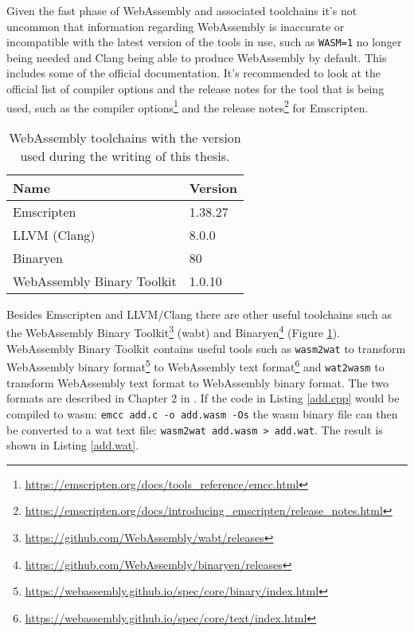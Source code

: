 Given the fast phase of WebAssembly and associated toolchains it's not uncommon that information regarding WebAssembly is inaccurate or incompatible with the latest version of the tools in use, such as \texttt{WASM=1} no longer being needed and Clang being able to produce WebAssembly by default. This includes some of the official documentation. It's recommended to look at the official list of compiler options and the release notes for the tool that is being used, such as the compiler options\footnote{\url{https://emscripten.org/docs/tools_reference/emcc.html}} and the release notes\footnote{\url{https://emscripten.org/docs/introducing_emscripten/release_notes.html}} for Emscripten.

\begin{table}[]
\caption{\label{toolchains}WebAssembly toolchains with the version used during the writing of this thesis.}
\centering
\begin{tabular}{ll}
\hline
\textbf{Name} & \textbf{Version} \\ \hline
Emscripten & 1.38.27 \\
LLVM (Clang) & 8.0.0 \\
Binaryen & 80 \\
WebAssembly Binary Toolkit & 1.0.10 \\ \hline
\end{tabular}
\end{table}
    
Besides Emscripten and LLVM/Clang there are other useful toolchains such as the WebAssembly Binary Toolkit\footnote{\url{https://github.com/WebAssembly/wabt/releases}} (wabt) and Binaryen\footnote{\url{https://github.com/WebAssembly/binaryen/releases}} (Figure \ref{toolchains}). WebAssembly Binary Toolkit contains useful tools such as \texttt{wasm2wat} to transform WebAssembly binary format\footnote{\url{https://webassembly.github.io/spec/core/binary/index.html}} to WebAssembly text format\footnote{\url{https://webassembly.github.io/spec/core/text/index.html}} and \texttt{wat2wasm} to transform WebAssembly text format to WebAssembly binary format. The two formats are described in Chapter 2 in \textcite{Rourke2018}. If the code in Listing \ref{add.cpp} would be compiled to wasm: \verb|emcc add.c -o add.wasm -Os| the wasm binary file can then be converted to a wat text file: \verb|wasm2wat add.wasm > add.wat|. The result is shown in Listing \ref{add.wat}.



